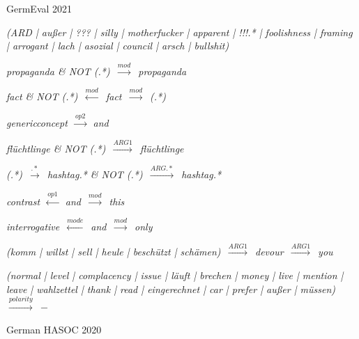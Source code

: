 \documentclass[sigconf,anonymous]{acmart}
\begin{document}
\begin{figure*}
GermEval 2021

\begin{description}
	\small
	\item \textit{(ARD | au{\ss}er | ??? | silly | motherfucker | apparent | !!!.* |
		foolishness | framing | arrogant | lach | asozial | council | arsch |
		bullshit)}
	\item \textit{propaganda \& NOT (.*)~$\xrightarrow{mod}$~propaganda}
	\item \textit{fact \& NOT (.*)~$\xleftarrow{mod}$~fact~$\xrightarrow{mod}$~(.*)}
	\item \textit{genericconcept~$\xrightarrow{op2}$~and}
	\item \textit{fl\"uchtlinge \& NOT (.*)~$\xrightarrow{ARG1}$~fl\"uchtlinge}
	\item \textit{(.*)~$\xrightarrow{.*}$~hashtag.* \& NOT (.*)~$\xrightarrow{ARG.*}$~hashtag.*}
	\item \textit{contrast~$\xleftarrow{op1}$~and~$\xrightarrow{mod}$~this}
	\item \textit{interrogative~$\xleftarrow{mode}$~and~$\xrightarrow{mod}$~only}
	\item \textit{(komm | willst | sell | heule | besch\"utzt | sch\"amen)~$\xrightarrow{ARG1}$~devour~$\xrightarrow{ARG1}$~you}
	\item \textit{(normal | level | complacency | issue | l\"auft | brechen | money | live | mention | leave | wahlzettel | thank | read | eingerechnet | car | prefer | au{\ss}er | m\"ussen)~$\xrightarrow{polarity}$~$-$}
\end{description}
\bigskip

German HASOC 2020


\end{figure*}
\end{document}

